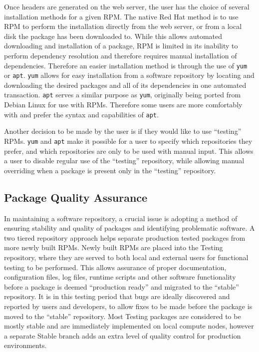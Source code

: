 Once headers are generated on the web server, the user has the choice of
several installation methods for a given RPM. The native Red Hat method is to
use RPM to perform the installation directly from the web server, or from a
local disk the package has been downloaded to. While this allows automated
downloading and installation of a package, RPM is limited in its inability to
perform dependency resolution and therefore requires manual installation of
dependencies. Therefore an easier installation method is through the use of \texttt{yum}
or \texttt{apt}. \texttt{yum} allows for easy installation from a software repository by locating
and downloading the desired packages and all of its dependencies in one
automated transaction. \texttt{apt} serves a similar purpose as \texttt{yum}, originally being
ported from Debian Linux for use with RPMs. Therefore some users are more
comfortably with and prefer the syntax and capabilities of \texttt{apt}.

Another decision to be made by the user is if they would like to use ``testing''
RPMs. \texttt{yum} and \texttt{apt} make it possible for a user to specify which repositories
they prefer, and which repositories are only to be used with manual input. This
allows a user to disable regular use of the ``testing'' repository, while allowing
manual overriding when a package is present only in the ``testing'' repository.

\subsection{Package Quality Assurance}

In maintaining a software repository, a crucial issue is adopting a method of
ensuring stability and quality of packages and identifying problematic
software. A two tiered repository approach helps separate production tested
packages from more newly built RPMs. Newly built RPMs are placed into the
Testing repository, where they are served to both local and external users for
functional testing to be performed. This allows assurance of proper
documentation, configuration files, log files, runtime scripts and other
software functionality before a package is deemed ``production ready'' and
migrated to the ``stable'' repository. It is in this testing period that bugs are ideally
discovered and reported by users and developers, to allow fixes to be made
before the package is moved to the ``stable'' repository. Most Testing packages are
considered to be mostly stable and are immediately implemented on local compute
nodes, however a separate Stable branch adds an extra level of quality control
for production environments.

